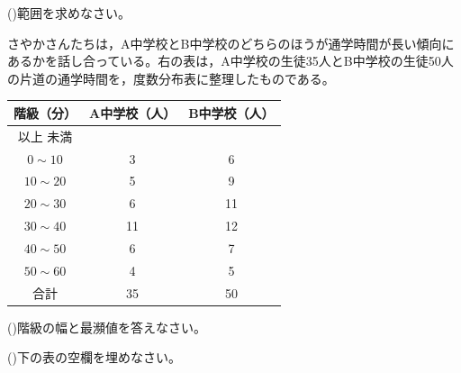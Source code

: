 \documentclass[
  12pt,a4paper,lualatex,ja=standard]{bxjsarticle}
\begin{document}
\begin{flushleft}
\begin{multicols}{2}
\columnbreak

()\hspace{2.5pt}範囲を求めなさい。

\end{multicols}

\vspace{3mm}

\begin{multicols}{2}

\setcounter{skaunta}{0}
\noindent{} \hspace{1pt}さやかさんたちは，A中学校とB中学校のどちらのほうが通学時間が長い傾向にあるかを話し合っている。右の表は，A中学校の生徒35人とB中学校の生徒50人の片道の通学時間を，度数分布表に整理したものである。

\columnbreak

\begin{tabular}{|c|c|c|}
\hline
階級（分） & A中学校（人） & B中学校（人）\\
\hline
\footnotesize{以上}\phantom{$\sim$} \footnotesize{未満} & & \\
$0 \sim 10$  & 3 & 6 \\
$10 \sim 20$ & 5 & 9 \\
$20 \sim 30$ & 6 & 11 \\
$30 \sim 40$ & 11 & 12 \\
$40 \sim 50$ & 6 & 7 \\
$50 \sim 60$ & 4 & 5 \\
\hline
合計 & 35 & 50 \\
\hline

\end{tabular}

\end{multicols}

()\hspace{2.5pt}階級の幅と最瀕値を答えなさい。

\vfill

()\hspace{2.5pt}下の表の空欄を埋めなさい。
\setcounter{kcounter}{0}

\begin{center}


\end{center}
\end{flushleft}
\end{document}
